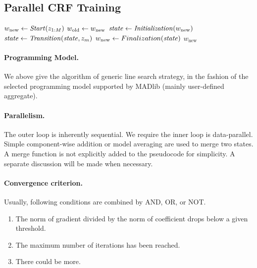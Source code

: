 \subsection{Parallel CRF Training}
\begin{algorithm} \label{alg:CRF training}
\begin{algorithmic}[1]
	\State $w_\text{new} \leftarrow \mathit{Start}(z_{1:M})$
	\Repeat
        \State $w_\text{old} \leftarrow w_\text{new}$
        \State $\mathit{state} \leftarrow \mathit{Initialization}(w_\text{new})$
		 
			\State $\mathit{state} \leftarrow \mathit{Transition}(\mathit{state}, z_m)$
		\EndFor
		\State $w_\text{new} \leftarrow Finalization(\mathit{state})$
    \State \Return $w_\text{new}$
\end{algorithmic}
\end{algorithm}

\paragraph{Programming Model.}
We above give the algorithm of generic line search strategy, in the fashion of the selected programming model supported by MADlib (mainly user-defined aggregate).

\paragraph{Parallelism.}
The outer loop is inherently sequential.
We require the inner loop is data-parallel.
Simple component-wise addition or model averaging are used to merge two states.
A merge function is not explicitly added to the pseudocode for simplicity.
A separate discussion will be made when necessary.

\paragraph{Convergence criterion.}
Usually, following conditions are combined by AND, OR, or NOT.
\begin{enumerate}
    \item The norm of gradient divided by the norm of coefficient drops below a given threshold.
    \item The maximum number of iterations has been reached.
    \item There could be more.
\end{enumerate}

